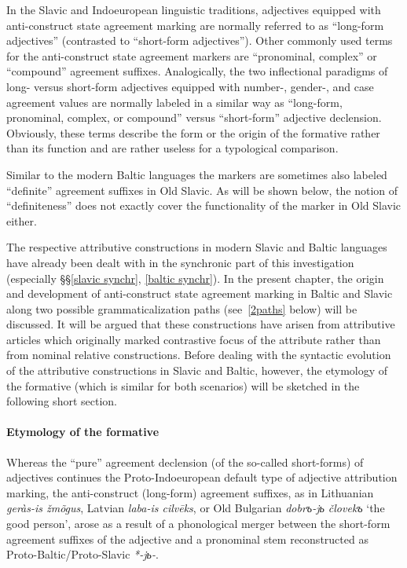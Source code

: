 In the Slavic and Indoeuropean linguistic traditions, adjectives equipped with anti-construct state agreement marking are normally referred to as “long-form adjectives” (contrasted to “short-form adjectives”). Other commonly used terms for the anti-construct state agreement markers are “pronominal, complex” or “compound” agreement suffixes. Analogically, the two inflectional paradigms of long- versus short-form adjectives equipped with number-, gender-, and case agreement values are normally labeled in a similar way as “long-form, pronominal, complex, or compound” versus “short-form” adjective declension. Obviously, these terms describe the form or the origin of the formative rather than its function and are rather useless for a typological comparison.

Similar to the modern Baltic languages the markers are sometimes also labeled “definite” agreement suffixes in Old Slavic. As will be shown below, the notion of “definiteness” does not exactly cover the functionality of the marker in Old Slavic either.

The respective attributive constructions in modern Slavic and Baltic languages have already been dealt with in the synchronic part of this investigation (especially \S\S\ref{slavic synchr}, \ref{baltic synchr}). In the present chapter, the origin and development of anti-construct state agreement marking in Baltic and Slavic along two possible grammaticalization paths (see~\ref{2paths} below) will be discussed. It will be argued that these constructions have arisen from attributive articles which originally marked contrastive focus of the attribute rather than from nominal relative constructions. Before dealing with the syntactic evolution of the attributive constructions in Slavic and Baltic, however, the etymology of the formative (which is similar for both scenarios) will be sketched in the following short section.

\paragraph{Etymology of the formative} 
Whereas the “pure” agreement declension (of the so-called short-forms) of adjectives continues the Proto-Indoeuropean default type of adjective attribution marking, the anti-construct (long-form) agreement suffixes, as in Lithuanian \textit{geràs-is žmõgus}, Latvian \textit{laba-is cilvēks}, or Old Bulgarian \textit{dobrъ-jь človekъ} ‘the good person’, arose as a result of a phonological merger between the short-form agreement suffixes of the adjective and a pronominal stem reconstructed as Proto-Baltic/Proto-Slavic \textit{*-jь-}.


